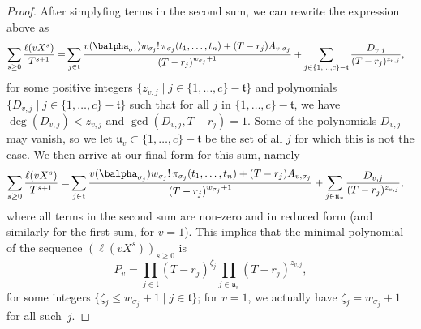 \documentclass[12pt]{article}
\newcommand{\minpoly}{P}
\newcommand{\lf}{X}
\begin{document}
\begin{proof}
  After simplyfing terms in the second sum, we can rewrite the
  expression above as
  \begin{align*}
    \sum_{s \ge 0} \frac{\ell(v \lf^s)}{T^{s+1}} =&
    \sum_{j \in \mathfrak{t}} \frac{
      v(\balpha_{\sigma_{j}})   w_{\sigma_{j}}!\, \pi_{{\sigma_{j}}}(t_1,\dots,t_n)
      + (T-r_{j} )A_{v,\sigma_{j}}}
	{(T-r_{j} )^{w_{\sigma_{j}}+1}}  
	+\sum_{j \in  \{1,\dots,c\}-\mathfrak{t}}
	\frac{D_{v,j}}
	     {(T-r_{j})^{z_{v,j}}},
  \end{align*}
  for some positive integers $\{z_{v,j} \mid j\in
  \{1,\dots,c\}-\mathfrak{t}\}$ and polynomials $\{D_{v,j} \mid j\in
  \{1,\dots,c\}-\mathfrak{t}\}$ such that for all $j$ in $
  \{1,\dots,c\}-\mathfrak{t}$, we have $\deg(D_{v,j}) < z_{v,j}$ and
  $\gcd(D_{v,j}, T-r_{j} )=1$. Some of the polynomials $D_{v,j}$ may
  vanish, so we let $\mathfrak{u}_v \subset
  \{1,\dots,c\}-\mathfrak{t}$ be the set of all $j$ for which this is
  not the case.  We then arrive at our final form for this sum, namely
  \begin{align}\label{eq:sumgenseries_collect1}
    \sum_{s \ge 0}  \frac{\ell(v \lf^s)}{T^{s+1}} =&
    \sum_{j \in \mathfrak{t}} \frac{
      v(\balpha_{\sigma_{j}})   w_{\sigma_{j}}!\, \pi_{{\sigma_{j}}}(t_1,\dots,t_n)
      + (T-r_{j}  )A_{v,\sigma_{j}}}
	{(T-r_{j} )^{w_{\sigma_{j}}+1}}  
	+\sum_{j \in  \mathfrak{u}_v}
	\frac{D_{v,j}}
	     {(T-r_{j} )^{z_{v,j}}},
  \end{align}
  where all terms in the second sum are non-zero and in reduced form
  (and similarly for the first sum, for $v=1$).
  This implies that the minimal
  polynomial of the sequence $(\ell(v\lf^s))_{s \ge 0}$ is 
  $$\minpoly_v=\prod_{j \in \mathfrak{t}} (T-r_{j})^{\zeta_j} \prod_{j
    \in \mathfrak{u}_v} (T-r_{j})^{z_{v,j}},$$
  for some integers $\{\zeta_j \le w_{\sigma_{j}}+1 \mid j \in \mathfrak{t}\}$; for $v=1$, 
  we actually have $\zeta_j = w_{\sigma_{j}}+1$ for all such~$j$.
	

\end{proof}
\end{document}
